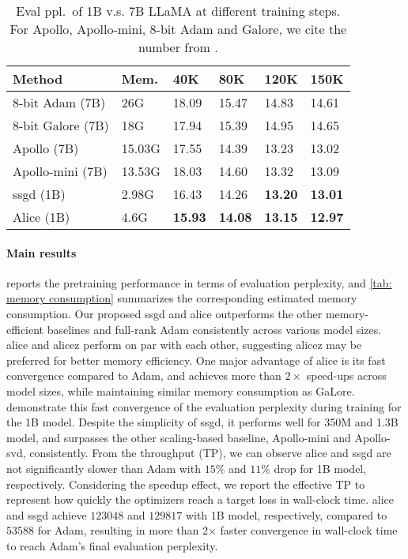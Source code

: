 \begin{table}[]
\centering
\caption{Eval ppl.~of 1B v.s. 7B LLaMA at different training steps. For Apollo, Apollo-mini, 8-bit Adam and Galore, we cite the number from \citet{zhu2024apollo}.}
\label{tab: 7B preformance}
\begin{tabular}{l|l|llll}
\hline
Method           & Mem.   & 40K & 80K & 120K & 150K \\ \hline
8-bit Adam (7B)&26G &18.09 & 15.47 & 14.83 & 14.61  \\
8-bit Galore (7B) &18G & 17.94 & 15.39 &14.95 &14.65\\
Apollo (7B)      & 15.03G &  17.55   &  14.39   &  13.23    &   13.02   \\
Apollo-mini (7B) & 13.53G &  18.03   &  14.60   &  13.32    &  13.09    \\\hline
\gls{ssgd} (1B) & 2.98G & 16.43 &14.26& \textbf{13.20}& \textbf{13.01}\\
Alice (1B)       & 4.6G   &  \textbf{15.93}   &  \textbf{14.08}   & \textbf{13.15}     & \textbf{12.97}     \\
\hline
\end{tabular}
\end{table}




\paragraph{Main results}  reports the pretraining performance in terms of evaluation perplexity, and \cref{tab: memory consumption} summarizes the corresponding estimated memory consumption. Our proposed \gls{ssgd} and \gls{alice} outperforms the other memory-efficient baselines and full-rank Adam consistently across various model sizes. \gls{alice} and \gls{alicez} perform on par with each other, suggesting \gls{alicez} may be preferred for better memory efficiency. One major advantage of \gls{alice} is its fast convergence compared to Adam, and achieves more than $2\times$ speed-ups across model sizes, while maintaining similar memory consumption as GaLore.  demonstrate this fast convergence of the evaluation perplexity during training for the 1B model. 
Despite the simplicity of \gls{ssgd}, it performs well for 350M and 1.3B model, and surpasses the other scaling-based baseline, Apollo-mini and Apollo-svd, consistently. 
From the throughput (TP), we can observe \gls{alice} and \gls{ssgd} are not significantly slower than Adam with $15\%$ and $11\%$ drop for 1B model, respectively. 
Considering the speedup effect, we report the effective TP to represent how quickly the optimizers reach a target loss in wall-clock time. \gls{alice} and \gls{ssgd} achieve $123048$ and $129817$ with 1B model, respectively, compared to $53588$ for Adam, resulting in more than 2× faster convergence in wall-clock time to reach Adam’s final evaluation perplexity.


